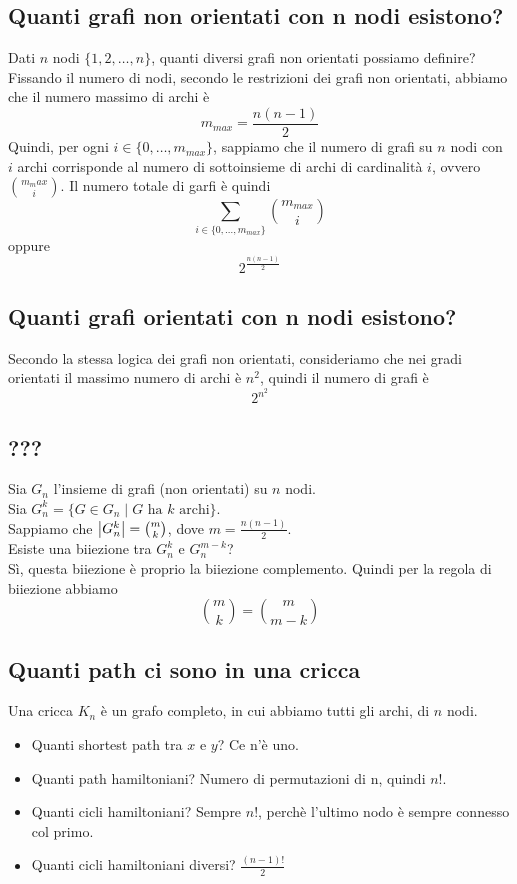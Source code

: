 \documentclass{article}
\begin{document}
\subsection*{Quanti grafi non orientati con n nodi esistono?}
Dati \(n\) nodi \(\{1,2,\ldots,n\}\), quanti diversi grafi non orientati possiamo definire? \\
Fissando il numero di nodi, secondo le restrizioni dei grafi non orientati, abbiamo che il numero massimo di archi è
\[m_{max} = \frac{n(n - 1)}{2}\]
Quindi, per ogni \(i \in \{0,\ldots,m_{max}\}\), sappiamo che il numero di grafi su \(n\) nodi con \(i\) archi corrisponde al numero di sottoinsieme di archi di cardinalità \(i\), ovvero \(\binom{m_max}{i}\). Il numero totale di garfi è quindi
\[\sum_{i \in \{0,\ldots,m_{max}\}} \binom{m_{max}}{i}\]
oppure
\[2^{\frac{n(n-1)}{2}}\]
\subsection*{Quanti grafi orientati con n nodi esistono?}
Secondo la stessa logica dei grafi non orientati, consideriamo che nei gradi orientati il massimo numero di archi è \(n^2\), quindi il numero di grafi è
\[2^{n^2}\]
\subsection*{???}
Sia \(G_n\) l'insieme di grafi (non orientati) su \(n\) nodi. \\
Sia \(G_n^k = \{G \in G_n \mid G \text{ ha } k \text{ archi}\}\). \\
Sappiamo che \(\left\lvert G_n^k \right\rvert = \binom{m}{k}\), dove \(m = \frac{n(n-1)}{2}\). \\
Esiste una biiezione tra \(G_n^k\) e \(G_n^{m-k}\)? \\
Sì, questa biiezione è proprio la biiezione complemento. Quindi per la regola di biiezione abbiamo
\[\binom{m}{k} = \binom{m}{m - k}\]
\subsection*{Quanti path ci sono in una cricca}
Una cricca \(K_n\) è un grafo completo, in cui abbiamo tutti gli archi, di \(n\) nodi.
\begin{itemize}
    \item Quanti shortest path tra \(x\) e \(y\)? Ce n'è uno.
    \item Quanti path hamiltoniani? Numero di permutazioni di n, quindi \(n!\).
    \item Quanti cicli hamiltoniani? Sempre \(n!\), perchè l'ultimo nodo è sempre connesso col primo.
    \item Quanti cicli hamiltoniani diversi? \(\frac{(n-1)!}{2}\)
\end{itemize}
\end{document}
